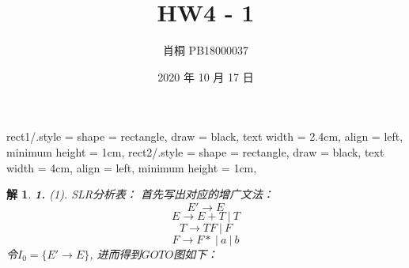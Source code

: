 \documentclass{article}
\begin{document}
	\title{HW4 - 1}
	\author{肖桐 PB18000037}
	\date{2020 年 10 月 17 日}
	\maketitle
	
	\tikzset
	{
		rect1/.style = {
    	shape = rectangle,
    	draw = black,
    	text width = 2.4cm,
    	align = left,
    	minimum height = 1cm,
		}
	}
	\tikzset
	{
		rect2/.style = {
    	shape = rectangle,
    	draw = black,
    	text width = 4cm,
    	align = left,
    	minimum height = 1cm,
		}
	}
	\newtheorem*{solution}{解}

	\begin{solution}\textnormal{\textbf{1.}}
		(1). SLR分析表：\newline
		首先写出对应的增广文法：\newline
		$$
		E' \to E
		$$
		$$
		E \to E + T\ |\ T
		$$
		$$
		T \to TF\ |\ F
		$$
		$$
		F \to F*\ |\ a\ |\ b
		$$
		令$I_0 = \{E' \to E\}$, 进而得到$GOTO$图如下：\newline
\end{solution}
\end{document}

